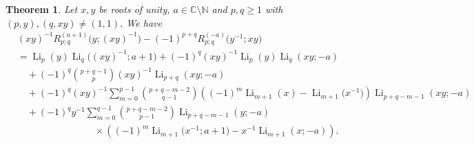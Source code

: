 \documentclass[11pt]{article}
\DeclareMathOperator{\Li}{Li}
\def\N{\mathbb{N}}
\theoremstyle{plain}
\newtheorem{thm}{Theorem}[section]
\theoremstyle{definition}
\begin{document}
\begin{thm}\label{thm-linearCES-3} Let $x,y$ be roots of unity, $a\in \mathbb{C}\setminus \N$ and $p,q\geq 1$ with $(p,y), (q,xy)\neq (1,1)$. We have
\begin{align}
&(xy)^{-1}R^{(a+1)}_{p;q}\Big(y;(xy)^{-1}\Big)-(-1)^{p+q}R_{p;q}^{(-a)}\Big(y^{-1};xy\Big)\nonumber\\
&=\Li_p(y)\Li_q\Big((xy)^{-1};a+1\Big)+(-1)^q(xy)^{-1}\Li_p(y)\Li_q(xy;-a)\nonumber\\&\quad+(-1)^q\binom{p+q-1}{p}(xy)^{-1}\Li_{p+q}(xy;-a)\nonumber\\
&\quad+(-1)^q (xy)^{-1} \sum_{m=0}^{p-1}\binom{p+q-m-2}{q-1}\left((-1)^m\Li_{m+1}(x)-\Li_{m+1}\Big(x^{-1}\Big)\right)\Li_{p+q-m-1}(xy;-a)\nonumber\\
&\quad+(-1)^q y^{-1} \sum_{m=0}^{q-1}\binom{p+q-m-2}{p-1}\Li_{p+q-m-1}(y;-a)\nonumber\\&\qquad\qquad\qquad\qquad\times\left((-1)^m\Li_{m+1}\Big(x^{-1};a+1\Big)-x^{-1}\Li_{m+1}(x;-a)\right).
\end{align}
\end{thm}
\end{document}
